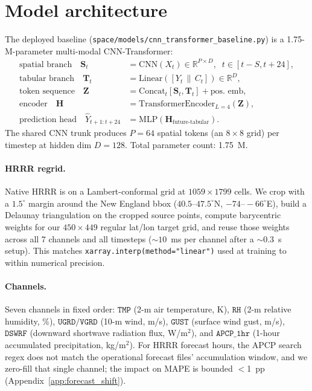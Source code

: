 
\section{Model architecture}
\label{app:model}

The deployed baseline (\texttt{space/models/cnn\_transformer\_baseline.py})
is a 1.75-M-parameter multi-modal CNN-Transformer:
\begin{align}
\text{spatial branch}\quad   \mathbf{S}_t &= \mathrm{CNN}(X_t) \in \mathbb{R}^{P\times D},                       \;\; t \in [t-S, t+24], \\
\text{tabular branch}\quad   \mathbf{T}_t &= \mathrm{Linear}([Y_t \,\|\, C_t]) \in \mathbb{R}^{D},               \\
\text{token sequence}\quad   \mathbf{Z} &= \mathrm{Concat}_t [\mathbf{S}_t, \mathbf{T}_t] + \text{pos.\ emb}, \\
\text{encoder}\quad          \mathbf{H} &= \mathrm{TransformerEncoder}_{L=4}(\mathbf{Z}),                       \\
\text{prediction head}\quad  \hat Y_{t+1:t+24} &= \mathrm{MLP}(\mathbf{H}_{\text{future-tabular}}).
\end{align}
The shared CNN trunk produces $P=64$ spatial tokens (an $8\times 8$
grid) per timestep at hidden dim $D=128$. Total parameter count: 1.75~M.

\paragraph{HRRR regrid.}
Native HRRR is on a Lambert-conformal grid at $1059\times 1799$ cells.
We crop with a $1.5^{\circ}$ margin around the New England bbox
($40.5\text{--}47.5^{\circ}$N, $-74\text{--}-66^{\circ}$E), build a
Delaunay triangulation on the cropped source points, compute
barycentric weights for our $450 \times 449$ regular lat/lon target
grid, and reuse those weights across all 7 channels and all timesteps
($\sim 10$~ms per channel after a $\sim 0.3$~s setup). This matches
\texttt{xarray.interp(method="linear")} used at training to within
numerical precision.

\paragraph{Channels.}
Seven channels in fixed order: $\texttt{TMP}$ (2-m air temperature, K),
$\texttt{RH}$ (2-m relative humidity, \%), $\texttt{UGRD}/\texttt{VGRD}$
(10-m wind, m/s), $\texttt{GUST}$ (surface wind gust, m/s),
$\texttt{DSWRF}$ (downward shortwave radiation flux, W/m$^2$), and
$\texttt{APCP\_1hr}$ (1-hour accumulated precipitation, kg/m$^2$). For
HRRR forecast hours, the APCP search regex does not match the
operational forecast files' accumulation window, and we zero-fill that
single channel; the impact on MAPE is bounded $<$1~pp
(Appendix~\ref{app:forecast_shift}).
